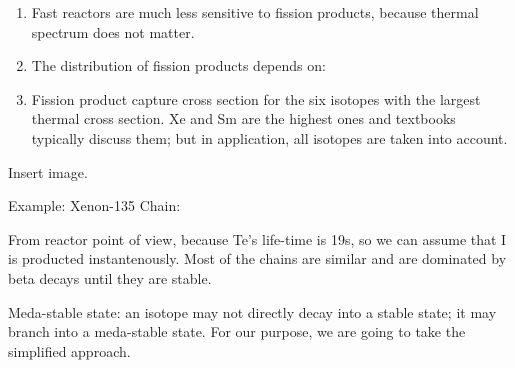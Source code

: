 \documentclass{school-22.211-notes}
\date{April  9, 2012}
\begin{document}
\maketitle

\begin{enumerate}


\item Fast reactors are much less sensitive to fission products, because thermal spectrum does not matter. 
\item The distribution of fission products depends on: 
\item Fission product capture cross section for the six isotopes with the largest thermal cross section. Xe and Sm are the highest ones and textbooks typically discuss them; but in application, all isotopes are taken into account. 
\end{enumerate}

Insert image.

Example: Xenon-135 Chain: 

From reactor point of view, because Te's life-time is 19s, so we can assume that I is producted instantenously. Most of the chains are similar and are dominated by beta decays until they are stable. 

Meda-stable state: an isotope may not directly decay into a stable state; it may branch into a meda-stable state. For our purpose, we are going to take the simplified approach.








\end{document}
